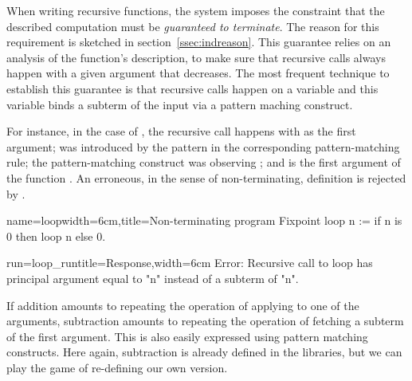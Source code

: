 When writing recursive functions, the \Coq{} system imposes the
constraint that the described computation must be \emph{guaranteed to
terminate}.  The reason for this requirement is sketched in
section~\ref{ssec:indreason}.
This guarantee relies on an analysis of the function's
description, to make sure that recursive calls always happen with a
given argument that decreases.  The most frequent technique to
establish this guarantee is that recursive calls happen on a variable
and this variable binds a subterm of the input via a pattern maching
construct.

For instance, in the case of , the recursive call happens
with  as the first argument;  was introduced by the pattern 
in the corresponding pattern-matching rule; the pattern-matching
construct was observing ; and  is the first argument of the
function .  An erroneous, in the sense of non-terminating,
definition is rejected by \Coq{}.

\begin{coq}{name=loop}{width=6cm,title=Non-terminating program}
Fixpoint loop n :=
 if n is 0 then loop n else 0.
$~$
\end{coq}
\begin{coqout}{run=loop_run}{title=Response,width=6cm}
Error: Recursive call to loop has
principal argument equal to "n"
instead of a subterm of "n".
\end{coqout}

%
%
If addition amounts to repeating the operation of applying 
to one of the arguments, subtraction amounts to repeating the
operation of fetching a subterm of the first argument.  This is also
easily expressed using pattern matching constructs.  Here again,
subtraction is already defined in the libraries, but we can play the game
of re-defining our own version.

